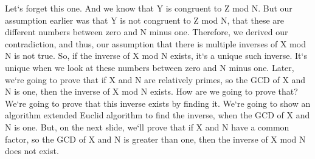 Let`s forget this one.
And we know that Y is congruent to Z mod N\@.
But our assumption earlier was that Y is not congruent to Z mod N, that these are different numbers between zero and N minus one.
Therefore, we derived our contradiction, and thus, our assumption that there is multiple inverses of X mod N is not true.
So, if the inverse of X mod N exists, it`s a unique such inverse.
It`s unique when we look at these numbers between zero and N minus one.
Later, we`re going to prove that if X and N are relatively primes, so the GCD of X and N is one, then the inverse of X mod N exists.
How are we going to prove that? We`re going to prove that this inverse exists by finding it.
We`re going to show an algorithm extended Euclid algorithm to find the inverse, when the GCD of X and N is one.
But, on the next slide, we`ll prove that if X and N have a common factor, so the GCD of X and N is greater than one, then the inverse of X mod N does not exist.

